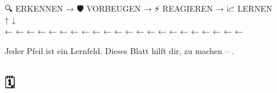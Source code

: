 🔍 ERKENNEN → 🛡️ VORBEUGEN → ⚡ REAGIEREN → 📈 LERNEN\\
↑ ↓\\
← ← ← ← ← ← ← ← ← ← ← ← ← ← ← ← ← ← ← ← ← ←

Jeder Pfeil ist ein Lernfeld. Dieses Blatt hilft dir, \textbf{\textcolor{ctmmBlue}{\1}} zu machen -- \textbf{\textcolor{ctmmBlue}{\1}}.

\hfill\break
\hfill\break

\hypertarget{tagesprotokoll-trigger-reaktion-lernfeld}{%
\subsection[ 🗓️ \ul{\textbf{\textcolor{ctmmBlue}{\1}}}]{\texorpdfstring{\protect\hypertarget{tagesprotokoll-trigger-reaktion-lernfeld}{}{} 🗓️ \ul{\textbf{\textcolor{ctmmBlue}{\1}}}}{ 🗓️ TAGESPROTOKOLL -- TRIGGER, REAKTION, LERNFELD}}\label{tagesprotokoll-trigger-reaktion-lernfeld}}

